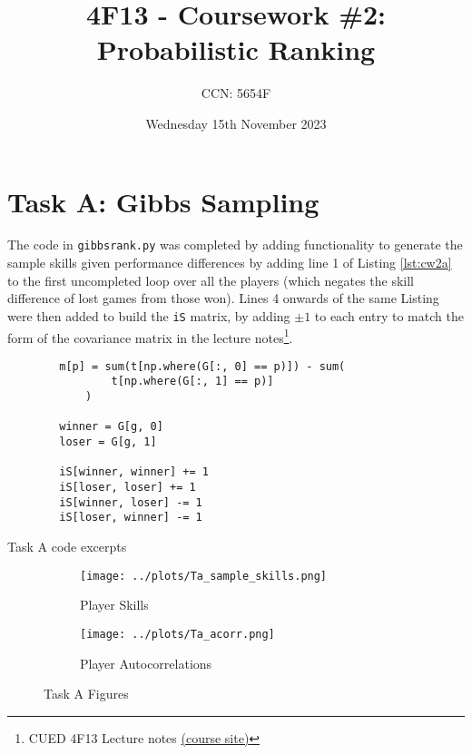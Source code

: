 \documentclass[11pt]{amsart}
\author{CCN: 5654F}
\title[4F13 - Coursework \#2: Probabilistic Ranking]{\vspace{-.4in}4F13 - Coursework \#2: Probabilistic Ranking\vspace{-.2in}}
\date{Wednesday 15th November 2023} %
\begin{document}
\maketitle
\vspace{-.4in}
\section{Task A: Gibbs Sampling} \label{sec:a}
The code in \verb|gibbsrank.py| was completed by adding functionality to generate the sample skills given performance differences by adding line 1 of Listing \ref{lst:cw2a} to the first uncompleted loop over all the players (which negates the skill difference of lost games from those won). Lines 4 onwards of the same Listing were then added to build the \verb|iS| matrix, by adding $\pm1$ to each entry to match the form of the covariance matrix in the lecture notes\footnote{\label{fn:l_notes}CUED 4F13 Lecture notes \href{Uhttps://mlg.eng.cam.ac.uk/teaching/4f13/2324/RL}{(course site)}}.

\begin{listing}[h]
    \begin{verbatim}
        m[p] = sum(t[np.where(G[:, 0] == p)]) - sum(
                t[np.where(G[:, 1] == p)]
            )
        
        winner = G[g, 0]
        loser = G[g, 1]

        iS[winner, winner] += 1
        iS[loser, loser] += 1
        iS[winner, loser] -= 1
        iS[loser, winner] -= 1
    \end{verbatim}
    \caption{Task A code excerpts} \label{lst:cw2a}
\end{listing}

\begin{figure}[h]
    \centering
    \begin{subfigure}[b]{0.62\textwidth}
        \centering
        \texttt{[image: ../plots/Ta\_sample\_skills.png]}
        \caption{Player Skills}
        \label{fig:ta_skills}
    \end{subfigure}
    \hfill
    \begin{subfigure}[b]{0.37\textwidth}
        \centering
        \texttt{[image: ../plots/Ta\_acorr.png]}
        \caption{Player Autocorrelations}
        \label{fig:ta_autocor}
    \end{subfigure}
    \caption{Task A Figures}
\end{figure} \label{fig:taska_all}
\end{document}
